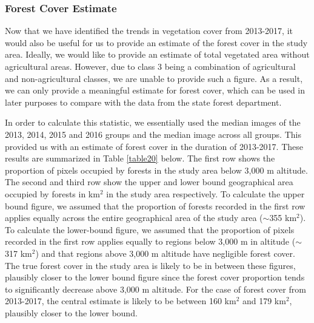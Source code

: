 \subsubsection{Forest Cover Estimate}

\justify
Now that we have identified the trends in vegetation cover from 2013-2017, it would also be useful for us to provide an estimate of the forest cover in the study area. Ideally, we would like to provide an estimate of total vegetated area without agricultural areas. However, due to class 3 being a combination of agricultural and non-agricultural classes, we are unable to provide such a figure. As a result, we can only provide a meaningful estimate for forest cover, which can be used in later purposes to compare with the data from the state forest department.

\justify
In order to calculate this statistic, we essentially used the median images of the 2013, 2014, 2015 and 2016 groups and the median image across all groups. This provided us with an estimate of forest cover in the duration of 2013-2017. These results are summarized in Table \ref{table20} below. The first row shows the proportion of pixels occupied by forests in the study area below 3,000 m altitude. The second and third row show the upper and lower bound geographical area occupied by forests in km$^2$ in the study area respectively. To calculate the upper bound figure, we assumed that the proportion of forests recorded in the first row applies equally across the entire geographical area of the study area ($\sim$355 km$^2$). To calculate the lower-bound figure, we assumed that the proportion of pixels recorded in the first row applies equally to regions below 3,000 m in altitude ($\sim$317 km$^2$) and that regions above 3,000 m altitude have negligible forest cover. The true forest cover in the study area is likely to be in between these figures, plausibly closer to the lower bound figure since the forest cover proportion tends to significantly decrease above 3,000 m altitude. For the case of forest cover from 2013-2017, the central estimate is likely to be between 160 km$^2$ and 179 km$^2$, plausibly closer to the lower bound.

